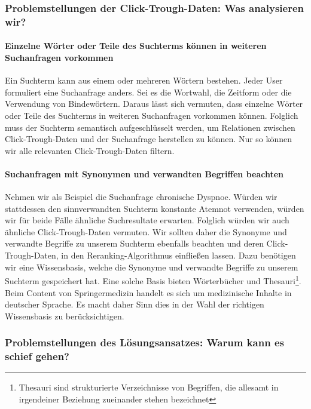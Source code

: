\subsubsection{Problemstellungen der Click-Trough-Daten: Was analysieren wir?}
\label{sec:Grundlagen:Grundbegriffe:SemantikUserInteraktionen:ProblemstellungenClick-Trough-Daten}

\paragraph{Einzelne Wörter oder Teile des Suchterms können in weiteren Suchanfragen vorkommen}
Ein Suchterm kann aus einem oder mehreren Wörtern bestehen. Jeder User formuliert eine Suchanfrage anders. Sei es die Wortwahl, die Zeitform oder die Verwendung von Bindewörtern. Daraus lässt sich vermuten, dass einzelne Wörter oder Teile des Suchterms in weiteren Suchanfragen vorkommen können. Folglich muss der Suchterm semantisch aufgeschlüsselt werden, um Relationen zwischen Click-Trough-Daten und der Suchanfrage herstellen zu können. Nur so können wir alle relevanten Click-Trough-Daten filtern.

\paragraph{Suchanfragen mit Synonymen und verwandten Begriffen beachten}
Nehmen wir als Beispiel die Suchanfrage \glqq chronische Dyspnoe\grqq{}. Würden wir stattdessen den sinnverwandten Suchterm \glqq konstante Atemnot\grqq{} verwenden, würden wir für beide Fälle ähnliche Suchresultate erwarten. Folglich würden wir auch ähnliche Click-Trough-Daten vermuten. Wir sollten daher die Synonyme und verwandte Begriffe zu unserem Suchterm ebenfalls beachten und deren Click-Trough-Daten, in den Reranking-Algorithmus einfließen lassen. Dazu benötigen wir eine Wissensbasis, welche die Synonyme und verwandte Begriffe zu unserem Suchterm gespeichert hat. Eine solche Basis bieten Wörterbücher und Thesauri\footnote{Thesauri sind strukturierte Verzeichnisse von Begriffen, die allesamt in irgendeiner Beziehung zueinander stehen bezeichnet}. Beim Content von Springermedizin handelt es sich um medizinische Inhalte in deutscher Sprache. Es macht daher Sinn dies in der Wahl der richtigen Wissensbasis zu berücksichtigen.

\subsubsection{Problemstellungen des Lösungsansatzes: Warum kann es schief gehen?}
\label{sec:Grundlagen:Grundbegriffe:SemantikUserInteraktionen:ProblemstellungenLoesungsansatz} 

